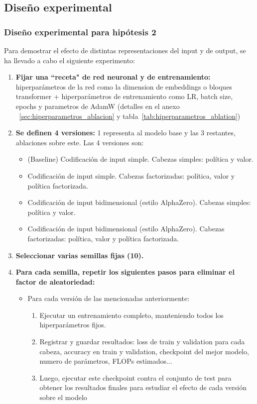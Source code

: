 \documentclass[12pt, a4paper]{article}
\begin{document}
\subsection{Diseño experimental}\label{sec:experimental_design}

\subsubsection{Diseño experimental para hipótesis 2}

Para demostrar el efecto de distintas representaciones del input y de output, se ha llevado a cabo el siguiente experimento:

\begin{enumerate}
\item \textbf{Fijar una ``receta" de red neuronal y de entrenamiento:} hiperparámetros de la red como la dimension de embeddings o bloques transformer + hiperparámetros de entrenamiento como LR, batch size, epochs y parametros de AdamW (detalles en el anexo ~\ref{sec:hiperparametros_ablacion} y tabla~\ref{tab:hiperparametros_ablation})
\item \textbf{Se definen 4 versiones:} 1 representa al modelo base y las 3 restantes, ablaciones sobre este. Las 4 versiones son:
    \begin{itemize}
        \item (Baseline) Codificación de input simple. Cabezas simples: política y valor.
        \item Codificación de input simple. Cabezas factorizadas: política, valor y política factorizada. 
        \item Codificación de input bidimensional (estilo AlphaZero). Cabezas simples: política y valor.
        \item Codificación de input bidimensional (estilo AlphaZero). Cabezas factorizadas: política, valor y política factorizada. 
    \end{itemize}
\item \textbf{Seleccionar varias semillas fijas (10).}
\item \textbf{Para cada semilla, repetir los siguientes pasos para eliminar el factor de aleatoriedad:}
    \begin{itemize}
        \item Para cada versión de las mencionadas anteriormente:

            \begin{enumerate}

                \item Ejecutar un entrenamiento completo, manteniendo todos los hiperparámetros fijos.
                \item Registrar y guardar resultados: loss de train y validation para cada cabeza, accuracy en train y validation, checkpoint del mejor modelo, numero de parámetros, FLOPs estimados...
                \item Luego, ejecutar este checkpoint contra el conjunto de test para obtener los resultados finales para estudiar el efecto de cada versión sobre el modelo
                

\end{enumerate}
\end{itemize}
\end{enumerate}
\end{document}
